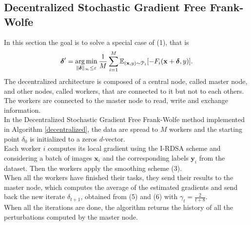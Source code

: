 \subsection{Decentralized Stochastic Gradient Free Frank-Wolfe}
In this section the goal is to solve a special case of (1), that is
\begin{equation}
	\mbox{\boldmath$ \delta$}' = \operatorname*{arg\,min}_{\lVert \mbox{\boldmath$\scriptstyle \delta$}\rVert_{\infty}\leq\varepsilon} \frac{1}{M}\sum_{i=1}^M \mathbb{E}_{(\mathbf{x},y)\sim \mathcal{P}_i}[- F_i(\mathbf{x}+\mbox{\boldmath$ \delta$},y)].
\end{equation}
The decentralized architecture is composed of a central node, called master node, and other nodes, called workers, that are connected to it but not to each others.
The workers are connected to the master node to read, write and exchange information.\\
\indent In the Decentralized Stochastic Gradient Free Frank-Wolfe method implemented in Algorithm \ref{decentralized}, the data are spread to $M$ workers and the starting point \mbox{\boldmath$ \delta$}$_{0}$ is initialized to a zeros $d$-vector.\\
\indent Each worker $i$ computes its local gradient using the I-RDSA scheme and considering a batch of images $\mathbf{x}_i$ and the corresponding labels $\mathbf{y}_i$ from the dataset. Then the workers apply the smoothing scheme (3).\\
\indent When all the workers have finished their tasks, they send their results to the master node, which computes the average of the estimated gradients and send back the new iterate \mbox{\boldmath$ \delta$}$_{t+1}$, obtained from (5) and (6) with $\gamma_t = \frac{2}{t+8}$.\\
\indent When all the iterations are done, the algorithm returns the history of all the perturbations computed by the master node.

